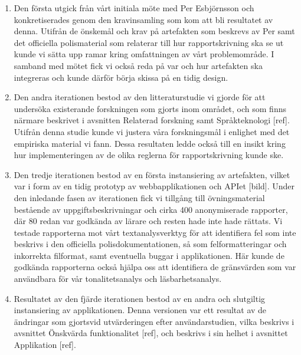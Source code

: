 \documentclass[swedish]{maucsthesis}
\begin{document}
\begin{enumerate}
\item Den första utgick från vårt initiala möte med Per Esbjörnsson och konkretiserades genom den kravinsamling som kom att bli resultatet av denna. Utifrån de önskemål och krav på artefakten som beskrevs av Per samt det officiella polismaterial som relaterar till hur rapportskrivning ska se ut kunde vi sätta upp ramar kring omfattningen av vårt problemområde. I samband med mötet fick vi också reda på var och hur artefakten ska integreras och kunde därför börja skissa på en tidig design.
\item Den andra iterationen bestod av den litteraturstudie vi gjorde för att undersöka existerande forskningen som gjorts inom området, och som finns närmare beskrivet i avsnitten Relaterad forskning samt Språkteknologi [ref]. Utifrån denna studie kunde vi justera våra forskningsmål i enlighet med det empiriska material vi fann. Dessa resultaten ledde också till en insikt kring hur implementeringen av de olika reglerna för rapportskrivning kunde ske.
\item Den tredje iterationen bestod av en första instansiering av artefakten, vilket var i form av en tidig prototyp av webbapplikationen och APIet [bild]. Under den inledande fasen av iterationen fick vi tillgång till övningsmaterial bestående av uppgiftsbeskrivningar och cirka 400 anonymiserade rapporter, där 80 redan var godkända av lärare och resten hade inte hade rättats. Vi testade rapporterna mot vårt textanalysverktyg för att identifiera fel som inte beskrivs i den officiella polisdokumentationen, så som felformatteringar och inkorrekta filformat, samt eventuella buggar i applikationen. Här kunde de godkända rapporterna också hjälpa oss att identifiera de gränsvärden som var användbara för vår tonalitetsanalys och läsbarhetsanalys. 
\item Resultatet av den fjärde iterationen bestod av en andra och slutgiltig instansiering av applikationen. Denna versionen var ett resultat av de ändringar som gjortsvid utvärderingen efter användarstudien, vilka beskrivs i avsnittet Önskvärda funktionalitet [ref], och beskrivs i sin helhet i avsnittet Applikation [ref].
\end{enumerate}
\end{document}
